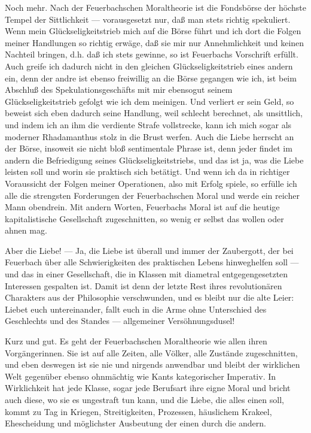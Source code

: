 Noch mehr. Nach der Feuerbachschen Moraltheorie ist die
Fondsbörse der höchste Tempel der Sittlichkeit --- vorausgesetzt nur, daß
man stets richtig spekuliert. Wenn mein Glückseligkeitstrieb mich auf
die Börse führt und ich dort die Folgen meiner Handlungen so richtig
erwäge, daß sie mir  nur Annehmlichkeit und keinen Nachteil bringen,
d.h. daß ich stets gewinne, so ist Feuerbachs Vorschrift erfüllt. Auch
greife ich dadurch nicht in den gleichen Glückseligkeitstrieb eines
andern ein, denn der andre ist ebenso freiwillig an die Börse gegangen
wie ich, ist beim Abschluß des Spekulationsgeschäfts mit mir ebensogut
seinem Glückseligkeitstrieb gefolgt wie ich dem meinigen. Und verliert
er sein Geld, so beweist sich eben dadurch seine Handlung, weil schlecht
berechnet, als unsittlich, und indem ich an ihm die verdiente Strafe
vollstrecke, kann ich mich sogar als moderner Rhadamanthus stolz in die
Brust werfen. Auch die Liebe herrscht an der Börse, insoweit sie nicht
bloß sentimentale Phrase ist, denn jeder findet im andern die
Befriedigung seines Glückseligkeitstriebs, und das ist ja, was die Liebe
leisten soll und worin sie praktisch sich betätigt. Und wenn ich da in
richtiger Voraussicht der Folgen meiner Operationen, also mit Erfolg
spiele, so erfülle ich alle die strengsten Forderungen der
Feuerbachschen Moral und werde ein reicher Mann obendrein. Mit andern
Worten, Feuerbachs Moral ist auf die heutige kapitalistische
Gesellschaft zugeschnitten, so wenig er selbst das wollen oder ahnen
mag.

Aber die Liebe! --- Ja, die Liebe ist überall und immer der
Zaubergott, der bei Feuerbach über alle Schwierigkeiten des praktischen
Lebens hinweghelfen soll --- und das in einer Gesellschaft, die in Klassen
mit diametral entgegengesetzten Interessen gespalten ist. Damit ist denn
der letzte Rest ihres revolutionären Charakters aus der Philosophie
verschwunden, und es bleibt nur die alte Leier: Liebet euch
untereinander, fallt euch in die Arme ohne Unterschied des Geschlechts
und des Standes --- allgemeiner Versöhnungsdusel!

Kurz und gut. Es geht der Feuerbachschen Moraltheorie wie allen
ihren Vorgängerinnen. Sie ist auf alle Zeiten, alle Völker, alle
Zustände zugeschnitten, und eben deswegen ist sie nie und nirgends
anwendbar und bleibt der wirklichen Welt gegenüber ebenso ohnmächtig wie
Kants kategorischer Imperativ. In Wirklichkeit hat jede Klasse, sogar
jede Berufsart ihre eigne Moral und bricht auch diese, wo sie es
ungestraft tun kann, und die Liebe, die alles einen soll, kommt zu Tag
in Kriegen, Streitigkeiten, Prozessen, häuslichem Krakeel, Ehescheidung
und möglichster Ausbeutung der einen durch die andern.\est\

